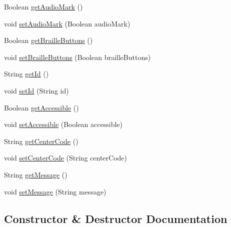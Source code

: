 \begin{DoxyCompactItemize}
\item 
Boolean \mbox{\hyperlink{classcom_1_1osoc_1_1oncera_1_1javabean_1_1_elevator_a71bdc208e2e195927241ccd14aae601f}{get\+Audio\+Mark}} ()
\item 
void \mbox{\hyperlink{classcom_1_1osoc_1_1oncera_1_1javabean_1_1_elevator_a6ae0f209d3d1212cce9446e66b73ab67}{set\+Audio\+Mark}} (Boolean audio\+Mark)
\item 
Boolean \mbox{\hyperlink{classcom_1_1osoc_1_1oncera_1_1javabean_1_1_elevator_a60daec8e79bdc2bf1c6355682107a3f0}{get\+Braille\+Buttons}} ()
\item 
void \mbox{\hyperlink{classcom_1_1osoc_1_1oncera_1_1javabean_1_1_elevator_a40ad2efbbb1842089bbf44d1e713d0d7}{set\+Braille\+Buttons}} (Boolean braille\+Buttons)
\item 
String \mbox{\hyperlink{classcom_1_1osoc_1_1oncera_1_1javabean_1_1_elevator_af86de5209f076cfe5ca17e8eab203866}{get\+Id}} ()
\item 
void \mbox{\hyperlink{classcom_1_1osoc_1_1oncera_1_1javabean_1_1_elevator_a747d607610502d6b755eebb968f81678}{set\+Id}} (String id)
\item 
Boolean \mbox{\hyperlink{classcom_1_1osoc_1_1oncera_1_1javabean_1_1_elevator_a2aaf75214265b04cde7e70e7ddd060de}{get\+Accessible}} ()
\item 
void \mbox{\hyperlink{classcom_1_1osoc_1_1oncera_1_1javabean_1_1_elevator_a4bb35377c676ade89a5375a9253d684c}{set\+Accessible}} (Boolean accessible)
\item 
String \mbox{\hyperlink{classcom_1_1osoc_1_1oncera_1_1javabean_1_1_elevator_a5aa69abe344aef9a323c1012078a90d7}{get\+Center\+Code}} ()
\item 
void \mbox{\hyperlink{classcom_1_1osoc_1_1oncera_1_1javabean_1_1_elevator_a52bc56a07b9356a49219c1d6be045a3c}{set\+Center\+Code}} (String center\+Code)
\item 
String \mbox{\hyperlink{classcom_1_1osoc_1_1oncera_1_1javabean_1_1_elevator_ae0a1a898a710aad94d352d20a670310a}{get\+Message}} ()
\item 
void \mbox{\hyperlink{classcom_1_1osoc_1_1oncera_1_1javabean_1_1_elevator_a89fbae6967b9ecdbf5369c29a25404bf}{set\+Message}} (String message)
\end{DoxyCompactItemize}


\subsection{Constructor \& Destructor Documentation}
\mbox{\label{classcom_1_1osoc_1_1oncera_1_1javabean_1_1_elevator_a067115a965ffdb6c6217eee594554f09}} 
